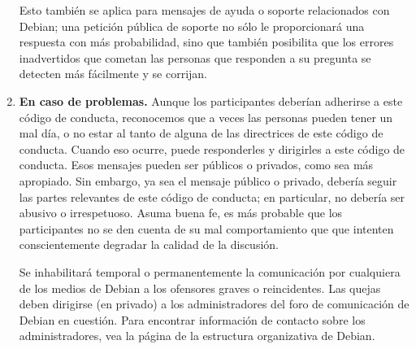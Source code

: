 \begin{enumerate}
Esto también se aplica para mensajes de ayuda o soporte relacionados con Debian; una petición pública de soporte no sólo le proporcionará una respuesta con más probabilidad, sino que también posibilita que los errores inadvertidos que cometan las personas que responden a su pregunta se detecten más fácilmente y se corrijan.

\item {\bf En caso de problemas.} Aunque los participantes deberían adherirse a este código de conducta, reconocemos que a veces las personas pueden tener un mal día, o no estar al tanto de alguna de las directrices de este código de conducta. Cuando eso ocurre, puede responderles y dirigirles a este código de conducta. Esos mensajes pueden ser públicos o privados, como sea más apropiado. Sin embargo, ya sea el mensaje público o privado, debería seguir las partes relevantes de este código de conducta; en particular, no debería ser abusivo o irrespetuoso. Asuma buena fe, es más probable que los participantes no se den cuenta de su mal comportamiento que que intenten conscientemente degradar la calidad de la discusión.

Se inhabilitará temporal o permanentemente la comunicación por cualquiera de los medios de Debian a los ofensores graves o reincidentes. Las quejas deben dirigirse (en privado) a los administradores del foro de comunicación de Debian en cuestión. Para encontrar información de contacto sobre los administradores, vea la página de la estructura organizativa de Debian.

\end{enumerate}

